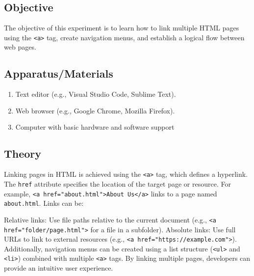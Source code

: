 \documentclass[a4paper,9pt]{article}
\begin{document}
\subsection{Objective}
The objective of this experiment is to learn how to link multiple HTML pages using the \texttt{\textless a\textgreater} tag, create navigation menus, and establish a logical flow between web pages.

\subsection{Apparatus/Materials}
\begin{enumerate}
	\item Text editor (e.g., Visual Studio Code, Sublime Text).
	\item Web browser (e.g., Google Chrome, Mozilla Firefox).
	\item Computer with basic hardware and software support
	
\end{enumerate}
\subsection{Theory}
Linking pages in HTML is achieved using the \texttt{\textless a\textgreater} tag, which defines a hyperlink. The \texttt{href} attribute specifies the location of the target page or resource. For example, \texttt{\textless a href="about.html"\textgreater About Us\textless /a\textgreater} links to a page named \texttt{about.html}. Links can be:

Relative links: Use file paths relative to the current document (e.g., \texttt{\textless a href="folder/page.html"\textgreater} for a file in a subfolder).
Absolute links: Use full URLs to link to external resources (e.g., \texttt{\textless a href="https://example.com"\textgreater}).
Additionally, navigation menus can be created using a list structure (\texttt{\textless ul\textgreater} and \texttt{\textless li\textgreater}) combined with multiple \texttt{\textless a\textgreater} tags. By linking multiple pages, developers can provide an intuitive user experience.
\end{document}
